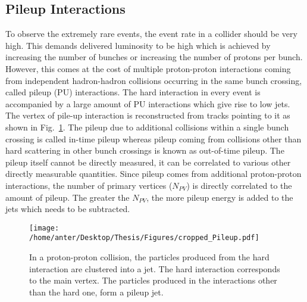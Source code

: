 \subsection{Pileup Interactions}
To observe the extremely rare events, the event rate in a collider should be very high. This demands delivered luminosity to be high which is achieved by increasing the number of bunches or increasing the number of protons per bunch. However, this comes at the cost of multiple proton-proton interactions coming from independent hadron-hadron collisions occurring in the same bunch crossing, called pileup (PU) interactions. The hard interaction in every event is accompanied by a large amount of PU interactions which give rise to low \pt jets. The vertex of pile-up interaction is reconstructed from tracks pointing to it as shown in Fig.~\ref{fig:pileup_d}. The pileup due to additional collisions within a single bunch crossing is called in-time pileup whereas pileup coming from collisions other than hard scattering in other bunch crossings is known as out-of-time pileup. The pileup itself cannot be directly measured, it can be correlated to various other directly measurable quantities. Since pileup comes from additional proton-proton interactions, the number of primary vertices ($N_{PV}$) is directly correlated to the amount of pileup. The greater the $N_{PV}$, the more pileup energy is added to the jets which needs to be subtracted. 
\begin{figure}[!h]
 \begin{center}
 \vspace*{4mm} 
 \texttt{[image: /home/anter/Desktop/Thesis/Figures/cropped\_Pileup.pdf]}\\
 \vspace*{5mm}
 \caption[Pileup Interactions]{In a proton-proton collision, the particles produced from the hard interaction are clustered into a jet. The hard interaction corresponds to the main vertex. The particles produced in the interactions other than the hard one, form a pileup jet\footnotemark.}
 \label{fig:pileup_d}
 \end{center}
\end{figure}


